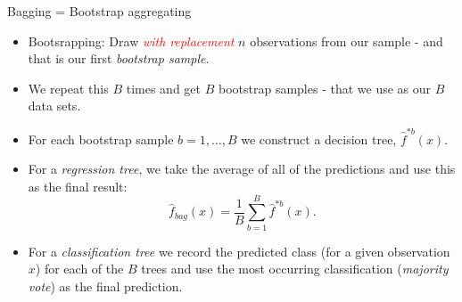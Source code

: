 \documentclass[10pt,ignorenonframetext,]{beamer}
\providecommand{\tightlist}{%
  \setlength{\itemsep}{0pt}\setlength{\parskip}{0pt}}
\begin{document}
\begin{frame}

\begin{block}{Bagging = Bootstrap aggregating}

\vspace{2mm}

\begin{itemize}
\tightlist
\item
  Bootsrapping: Draw \emph{\textcolor{red}{with replacement}} \(n\)
  observations from our sample - and that is our first \emph{bootstrap
  sample}.
\end{itemize}

\vspace{2mm}

\begin{itemize}
\tightlist
\item
  We repeat this \(B\) times and get \(B\) bootstrap samples - that we
  use as our \(B\) data sets.
\end{itemize}

\vspace{2mm}

\begin{itemize}
\tightlist
\item
  For each bootstrap sample \(b=1,\ldots, B\) we construct a decision
  tree, \(\hat{f}^{*b}(x)\).
\end{itemize}

\vspace{2mm}

\begin{itemize}
\tightlist
\item
  For a \emph{regression tree}, we take the average of all of the
  predictions and use this as the final result: \[
  \hat{f}_{bag}(x)=\frac{1}{B}\sum_{b=1}^B \hat{f}^{*b}(x).
  \]
\end{itemize}

\vspace{2mm}

\begin{itemize}
\tightlist
\item
  For a \emph{classification tree} we record the predicted class (for a
  given observation \(x\)) for each of the \(B\) trees and use the most
  occurring classification (\emph{majority vote}) as the final
  prediction.
\end{itemize}

\end{block}

\end{frame}
\end{document}
